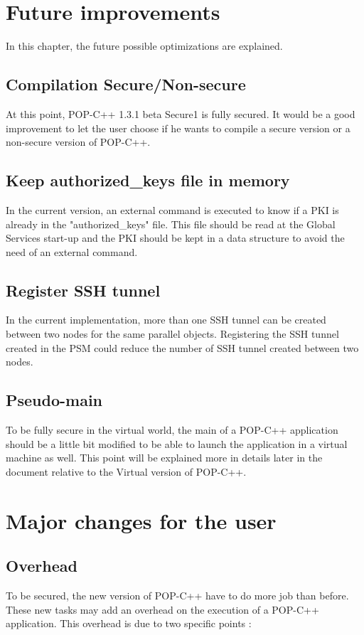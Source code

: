 \pagebreak
\section{Future improvements}
In this chapter, the future possible optimizations are explained.

\subsection{Compilation Secure/Non-secure}
At this point, POP-C++ 1.3.1 beta Secure1 is fully secured. It would be a good improvement to let the user choose if he wants to compile a secure version or a non-secure version of POP-C++.

\subsection{Keep authorized\_keys file in memory}
In the current version, an external command is executed to know if a PKI is already in the "authorized\_keys" file. This file should be read at the Global Services start-up and the PKI should be kept in a data structure to avoid the need of an external command.

\subsection{Register SSH tunnel}
In the current implementation, more than one SSH tunnel can be created between two nodes for the same parallel objects. Registering the SSH tunnel created in the PSM could reduce the number of SSH tunnel created between two nodes. 

\subsection{Pseudo-main}
To be fully secure in the virtual world, the main of a POP-C++ application should be a little bit modified to be able to launch the application in a virtual machine as well. This point will be explained more in details later in the document relative to the Virtual version of POP-C++\cite{vpopc_clement}.

\section{Major changes for the user}

\subsection{Overhead}
To be secured, the new version of POP-C++ have to do more job than before. These new tasks may add an overhead on the execution of a POP-C++ application. This overhead is due to two specific points : 

